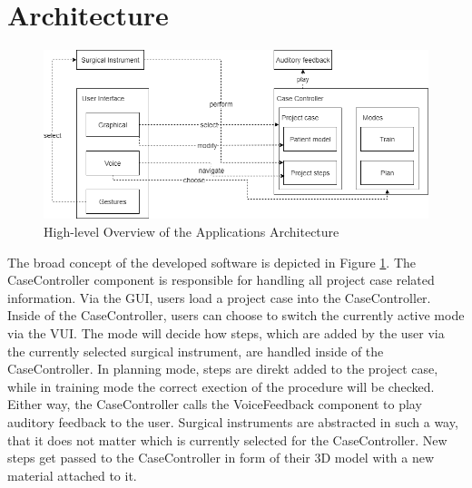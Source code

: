 \section{\label{sec::Architecture}Architecture}

\begin{figure}[ht!]
    \centering
    \includegraphics[width=\linewidth]{images/implementation/architecture.png}
    \caption{\label{fig::ImplementationArchitecture}High-level Overview of the Applications Architecture}
\end{figure}

The broad concept of the developed software is depicted in Figure \ref{fig::ImplementationArchitecture}.
The CaseController component is responsible for handling all project case related information.
Via the GUI, users load a project case into the CaseController.
Inside of the CaseController, users can choose to switch the currently active mode via the VUI.
The mode will decide how steps, which are added by the user via the currently selected surgical instrument, are handled inside of the CaseController.
In planning mode, steps are direkt added to the project case, while in training mode the correct exection of the procedure will be checked.
Either way, the CaseController calls the VoiceFeedback component to play auditory feedback to the user.
Surgical instruments are abstracted in such a way, that it does not matter which is currently selected for the CaseController.
New steps get passed to the CaseController in form of their 3D model with a new material attached to it.


